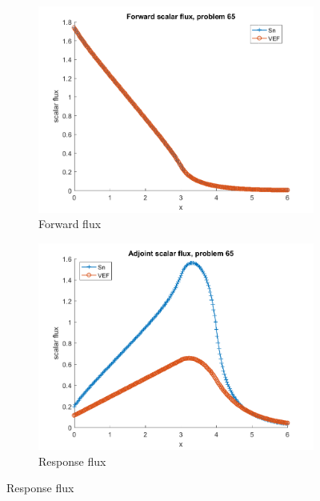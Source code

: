 \documentclass{article}
\begin{document}
\begin{figure}[H]
\label{Case65Flux}
\centering
\begin{subfigure}{.5\textwidth}
  \centering
  \includegraphics[width=.98\linewidth]{IanProposal/figures2/65phi.png}
  \caption{Forward flux}
  \label{fig:sfig1}
\end{subfigure}%
\begin{subfigure}{.5\textwidth}
  \centering
  \includegraphics[width=.98\linewidth]{IanProposal/figures2/65phia.png}
  \caption{Response flux}
  \label{fig:sfig4}
\end{subfigure}%
\end{figure}
\end{document}
